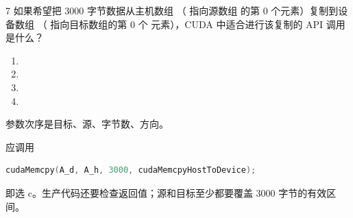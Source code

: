 \begin{solutionexercise}{7}
\problemheading 如果希望把 3000 字节数据从主机数组 （ 指向源数组
的第 0 个元素）复制到设备数组 （ 指向目标数组的第 0 个
元素），CUDA 中适合进行该复制的 API 调用是什么？
\begin{enumerate}[label=\alph*.,leftmargin=2.2em]
  \item {}
  \item {}
  \item {}
  \item {}
\end{enumerate}

\approachheading {} 参数次序是目标、源、字节数、方向。

\answerheading 应调用
\begin{lstlisting}[language=C++]
cudaMemcpy(A_d, A_h, 3000, cudaMemcpyHostToDevice);
\end{lstlisting}
即选 c。生产代码还要检查返回值；源和目标至少都要覆盖 3000 字节的有效区间。


\end{solutionexercise}
